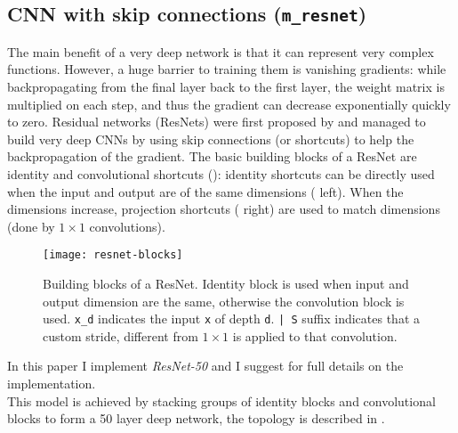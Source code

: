 \subsection{CNN with skip connections (\texttt{m_resnet})}
\label{sec:m_resnet}
The main benefit of a very deep network is that it can represent very complex functions. However, a huge barrier to training them is vanishing gradients: while backpropagating from the final layer back to the first layer, the weight matrix is multiplied on each step, and thus the gradient can decrease exponentially quickly to zero. Residual networks (ResNets) were first proposed by \cite{resnets-2015} and managed to build very deep CNNs by using skip connections (or shortcuts) to help the backpropagation of the gradient.
The basic building blocks of a ResNet are identity and convolutional shortcuts (): identity shortcuts can be directly used when the input and output are of the same dimensions ( left). When the dimensions increase, projection shortcuts ( right) are used to match dimensions (done by $1 \times 1$ convolutions). \\

\begin{figure}[h]
	\captionsetup{font=scriptsize, justification=centering}
    \centering
	\texttt{[image: resnet-blocks]}
    \caption{Building blocks of a ResNet. Identity block is used when input and output dimension are the same, otherwise the convolution block is used. \texttt{x_d} indicates the input \texttt{x} of depth \texttt{d}. \texttt{| S} suffix indicates that a custom stride, different from $1 \times 1$ is applied to that convolution.}
    \label{fig:img_resnet}
\end{figure}

In this paper I implement {\it ResNet-50} and I suggest \cite{resnets-2015} for full details on the implementation.\\
This model is achieved by stacking groups of identity blocks and convolutional blocks to form a 50 layer deep network, the topology is described in .

